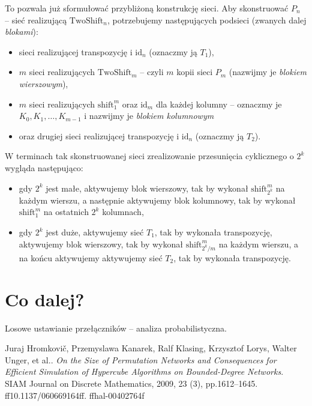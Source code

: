 \documentclass[a4paper]{article}
\newcommand{\shift}[2]{\text{shift}_{#2}^{#1}}
\newcommand{\id}[1]{\text{id}_{#1}}
\newcommand{\twoshift}[1]{\text{TwoShift}_{#1}}
\theoremstyle{definition}
\begin{document}
To pozwala już sformułować przybliżoną konstrukcję sieci. Aby skonstruować \(P_n\) -- sieć realizującą \(\twoshift n\), potrzebujemy następujących podsieci (zwanych dalej \textit{blokami}):

\begin{itemize}
    \item sieci realizującej transpozycję i \(\id n\) (oznaczmy ją \(T_1\)),
    \item \(m\) sieci realizujących \( \twoshift m\) -- czyli \(m\) kopii sieci \(P_m\) (nazwijmy je \textit{blokiem wierszowym}),
    \item \(m\) sieci realizujących \(\shift m 1\) oraz \(\id m\) dla każdej kolumny -- oznaczmy je \(K_0, K_1, \ldots, K_{m-1}\) i nazwijmy je \textit{blokiem kolumnowym}
    \item oraz drugiej sieci realizującej transpozycję i \(\id n\) (oznaczmy ją \(T_2\)).
\end{itemize}

W terminach tak skonstruowanej sieci zrealizowanie przesunięcia cyklicznego o \(2^k\) wygląda następująco:

\begin{itemize}
    \item gdy \(2^k\) jest małe, aktywujemy blok wierszowy, tak by wykonał \(\shift m {2^k}\) na każdym wierszu, a następnie aktywujemy blok kolumnowy, tak by wykonał \(\shift m 1\) na ostatnich \(2^k\) kolumnach,
    \item gdy \(2^k\) jest duże, aktywujemy sieć \(T_1\), tak by wykonała transpozycję, aktywujemy blok wierszowy, tak by wykonał \(\shift m {2^k/m}\) na każdym wierszu, a na końcu aktywujemy aktywujemy sieć \(T_2\), tak by wykonała transpozycję.
\end{itemize}



\section{Co dalej?}

Losowe ustawianie przełączników -- analiza probabilistyczna. 


\begin{thebibliography}{9}
Juraj Hromkovič, Przemyslawa Kanarek, Ralf Klasing, Krzysztof Lorys, Walter Unger, et al.. \emph{On the Size of Permutation Networks and Consequences for Efficient Simulation of Hypercube Algorithms on Bounded-Degree Networks}. SIAM Journal on Discrete Mathematics, 2009, 23 (3), pp.1612–1645. ff10.1137/060669164ff. ffhal-00402764f
\end{thebibliography}
\end{document}
